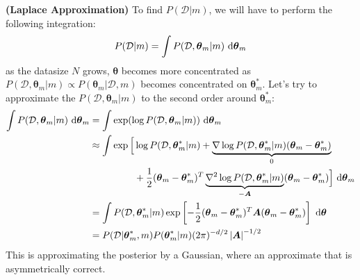 \begin{remark}{\textbf{(Laplace Approximation)}}
    To find $P(\mathcal{D} | m)$, we will have to perform the following integration:
    \begin{equation*}
        P(\mathcal{D}|m) = \int P(\mathcal{D}, \boldsymbol \theta_m | m)\ \mathrm{d}\boldsymbol \theta_m
    \end{equation*}
    as the datasize $N$ grows, $\boldsymbol \theta$ becomes more concentrated as $P(\mathcal{D}, \boldsymbol \theta_m|m)\propto P(\boldsymbol \theta_m | \mathcal{D}, m)$ becomes concentrated on $\boldsymbol \theta_m^*$. Let's try to approximate the $P(\mathcal{D}, \boldsymbol \theta_m|m)$ to the second order around $\boldsymbol \theta_m^*$:
    \begin{equation*}
    \begin{aligned}
        \int P(\mathcal{D}, \boldsymbol \theta_m|m)\ \mathrm{d}\boldsymbol \theta_m &= \int \exp(\log P(\mathcal{D}, \boldsymbol \theta_m|m))\ \mathrm{d} \boldsymbol \theta_m \\
        &\approx\begin{aligned}[t]
            \int \exp\Big[ &\log P(\mathcal{D}, \boldsymbol \theta^*_m | m) + \underbrace{\nabla \log P(\mathcal{D}, \boldsymbol \theta_m^* | m)(\boldsymbol \theta_m - \boldsymbol \theta_m^*)}_{0} \\
            &+\frac{1}{2}(\boldsymbol \theta_m-\boldsymbol \theta_m^*)^T\underbrace{\nabla^2\log P(\mathcal{D}, \boldsymbol \theta_m^* | m)}_{-\boldsymbol A}(\boldsymbol \theta_m - \boldsymbol \theta_m^*) \Big]\ \mathrm{d}\boldsymbol \theta_m 
        \end{aligned} \\
        &=\int P(\mathcal{D}, \boldsymbol \theta^*_m | m)\exp\left[ -\frac{1}{2}(\boldsymbol \theta_m-\boldsymbol \theta_m^*)^T\boldsymbol A(\boldsymbol \theta_m - \boldsymbol \theta_m^*) \right]\ \mathrm{d}\boldsymbol \theta \\
        &= P(\mathcal{D}|\boldsymbol \theta^*_m,m)P(\boldsymbol \theta^*_m|m)(2\pi)^{-d/2}\left| \boldsymbol A \right|^{-1/2}
    \end{aligned}
    \end{equation*}
    This is approximating the posterior by a Gaussian, where an approximate that is asymmetrically correct. 
\end{remark}

